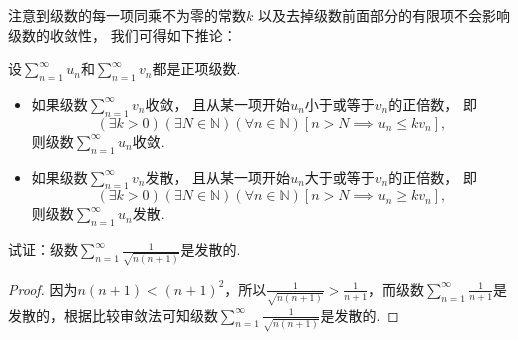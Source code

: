 注意到级数的每一项同乘不为零的常数\(k\)
以及去掉级数前面部分的有限项不会影响级数的收敛性，
我们可得如下推论：
\begin{corollary}\label{theorem:无穷级数.正项级数的比较审敛法的推论}
设\(\sum_{n=1}^\infty u_n\)和\(\sum_{n=1}^\infty v_n\)都是正项级数.
\begin{itemize}
	\item 如果级数\(\sum_{n=1}^\infty v_n\)收敛，
	且从某一项开始\(u_n\)小于或等于\(v_n\)的正倍数，
	即\[
		(\exists k>0)
		(\exists N\in\mathbb{N})
		(\forall n\in\mathbb{N})
		[
			n > N
			\implies
			u_n \leq k v_n
		],
	\]
	则级数\(\sum_{n=1}^\infty u_n\)收敛.

	\item 如果级数\(\sum_{n=1}^\infty v_n\)发散，
	且从某一项开始\(u_n\)大于或等于\(v_n\)的正倍数，
	即\[
		(\exists k>0)
		(\exists N\in\mathbb{N})
		(\forall n\in\mathbb{N})
		[
			n > N
			\implies
			u_n \geq k v_n
		],
	\]
	则级数\(\sum_{n=1}^\infty u_n\)发散.
\end{itemize}
\end{corollary}

\begin{example}
试证：级数\(\sum_{n=1}^\infty \frac{1}{\sqrt{n(n+1)}}\)是发散的.
\begin{proof}
因为\(n(n+1) < (n+1)^2\)，所以\(\frac{1}{\sqrt{n(n+1)}} > \frac{1}{n+1}\)，而级数\(\sum_{n=1}^\infty \frac{1}{n+1}\)是发散的，根据比较审敛法可知级数\(\sum_{n=1}^\infty \frac{1}{\sqrt{n(n+1)}}\)是发散的.
\end{proof}
\end{example}

